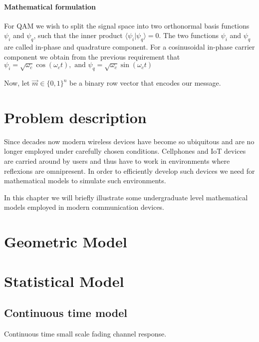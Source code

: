 \paragraph{Mathematical formulation}

For QAM we wish to split the signal space into two orthonormal basis functions \(\psi_i\) and \(\psi_q\), such that the inner product \(\langle \psi_i | \psi_q \rangle = 0\). The two functions \(\psi_i\) and \(\psi_q\) are called in-phase and quadrature component. For a cosinusoidal in-phase carrier component we obtain from the previous requirement that \(\psi_i = \sqrt{\omega_c} \cos(\omega_c t), \text{ and } \psi_q = \sqrt{\omega_c} \sin(\omega_c t)\)

Now, let \(\vec{m} \in \{0,1\}^n\) be a binary row vector that encodes our message.

\section{Problem description}

Since decades now modern wireless devices have become so ubiquitous and are no longer employed under carefully chosen conditions. Cellphones and IoT devices are carried around by users and thus have to work in environments where reflexions are omnipresent. In order to efficiently develop such devices we need for mathematical models to simulate such environments.

In this chapter we will briefly illustrate some undergraduate level mathematical models employed in modern communication devices.

\section{Geometric Model}

\section{Statistical Model}


\subsection{Continuous time model}

Continuous time small scale fading channel response. \cite{Alimohammad2009}

